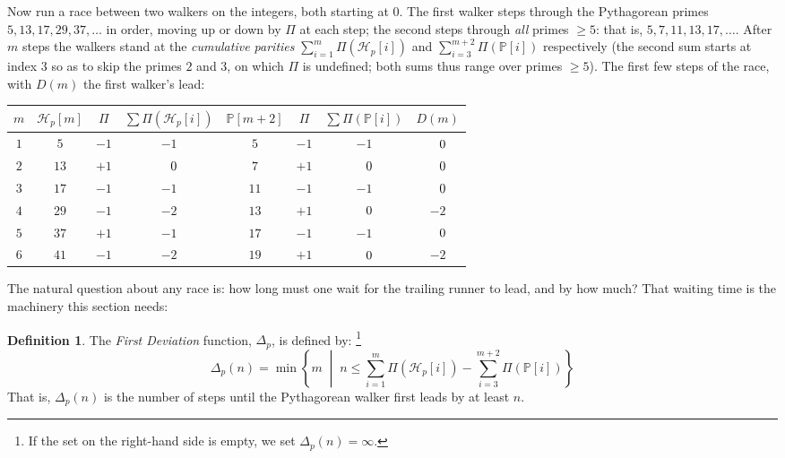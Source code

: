 \documentclass{article}
\theoremstyle{plain}
\theoremstyle{definition}
\newtheorem{defn}{Definition}
\theoremstyle{remark}
\begin{document}
Now run a race between two walkers on the integers, both starting at $0$.
The first walker steps through the Pythagorean primes
$5, 13, 17, 29, 37, \ldots$ in order, moving up or down by
$\Pi$ at each step; the second steps through {\em all\/} primes
$\ge 5$: that is, $5, 7, 11, 13, 17, \ldots$.
After $m$ steps the walkers stand at the {\em cumulative parities\/}
$\sum_{i=1}^m \Pi(\mathcal{H}_p[i])$ and
$\sum_{i=3}^{m+2} \Pi(\mathbb{P}[i])$ respectively (the second sum starts
at index $3$ so as to skip the primes $2$ and $3$, on which $\Pi$ is
undefined; both sums thus range over primes $\ge 5$). The first few steps
of the race, with $D(m)$ the first walker's lead:
\begin{center}
\begin{tabular}{c|ccc|ccc|c}
 $m$ & $\mathcal{H}_p[m]$ & $\Pi$ & $\sum \Pi(\mathcal{H}_p[i])$
     & $\mathbb{P}[m+2]$ & $\Pi$ & $\sum \Pi(\mathbb{P}[i])$ & $D(m)$ \\
\hline
 $1$ & $5$  & $-1$ & $-1$ & $5$  & $-1$ & $-1$ & $\hphantom{-}0$ \\
 $2$ & $13$ & $+1$ & $\hphantom{-}0$ & $7$  & $+1$ & $\hphantom{-}0$ & $\hphantom{-}0$ \\
 $3$ & $17$ & $-1$ & $-1$ & $11$ & $-1$ & $-1$ & $\hphantom{-}0$ \\
 $4$ & $29$ & $-1$ & $-2$ & $13$ & $+1$ & $\hphantom{-}0$ & $-2$ \\
 $5$ & $37$ & $+1$ & $-1$ & $17$ & $-1$ & $-1$ & $\hphantom{-}0$ \\
 $6$ & $41$ & $-1$ & $-2$ & $19$ & $+1$ & $\hphantom{-}0$ & $-2$ \\
\end{tabular}
\end{center}
The natural question about any race is: how long must one wait for the
trailing runner to lead, and by how much? That waiting time is the
machinery this section needs:

\begin{defn}
The {\em First Deviation\/} function, $\Delta_p$, is defined by:%
\footnote{If the set on the right-hand side is empty, we set $\Delta_p(n) = \infty$.}
\begin{equation}
\Delta_p(n) = \min \left\{ m \;\middle|\; n \le \sum_{i=1}^m \Pi(\mathcal{H}_p[i]) - \sum_{i=3}^{m+2} \Pi(\mathbb{P}[i]) \right\}
\end{equation}
That is, $\Delta_p(n)$ is the number of steps until the Pythagorean walker
first leads by at least $n$.
\end{defn}
\end{document}

